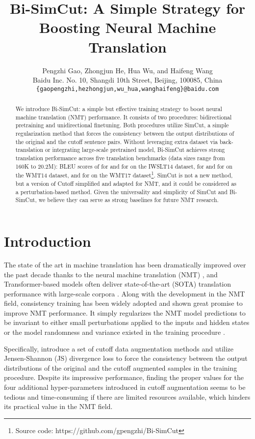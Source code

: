 \documentclass[11pt]{article}
\title{Bi-SimCut: A Simple Strategy for Boosting Neural Machine Translation}
\author{Pengzhi Gao, Zhongjun He, Hua Wu, and Haifeng Wang \\
Baidu Inc. No. 10, Shangdi 10th Street, Beijing, 100085, China \\
\texttt{\{gaopengzhi,hezhongjun,wu\_hua,wanghaifeng\}@baidu.com} 
}
\begin{document}
\maketitle


\begin{abstract}
We introduce Bi-SimCut: a simple but effective training strategy to boost neural machine translation (NMT) performance. It consists of two procedures: bidirectional pretraining and unidirectional finetuning. Both procedures utilize SimCut, a simple regularization method that forces the consistency between the output distributions of the original and the cutoff sentence pairs. Without leveraging extra dataset via back-translation or integrating large-scale pretrained model, Bi-SimCut achieves strong translation performance across five translation benchmarks (data sizes range from 160K to 20.2M): BLEU scores of  for  and  for  on the IWSLT14 dataset,  for  and  for  on the WMT14 dataset, and  for  on the WMT17 dataset\footnote{Source code: https://github.com/gpengzhi/Bi-SimCut}. SimCut is not a new method, but a version of Cutoff \cite{shen2020simple} simplified and adapted for NMT, and it could be considered as a perturbation-based method. Given the universality and simplicity of SimCut and Bi-SimCut, we believe they can serve as strong baselines for future NMT research.
\end{abstract}


\section{Introduction}

The state of the art in machine translation has been dramatically improved over the past decade thanks to the neural machine translation (NMT) \cite{wu2016google}, and Transformer-based models \cite{vaswani2017attention} often deliver state-of-the-art (SOTA) translation performance with large-scale corpora \cite{ott2018scaling}.
Along with the development in the NMT field, consistency training \cite{bachman2014learning} has been widely adopted and shown great promise to improve NMT performance. It simply regularizes the NMT model predictions to be invariant to either small perturbations applied to the inputs \cite{sano2019effective,shen2020simple} and hidden states \cite{chen2021manifold} or the model randomness and variance existed in the training procedure \cite{liang2021r}. 

Specifically, \citet{shen2020simple} introduce a set of cutoff data augmentation methods and utilize Jensen-Shannon (JS) divergence loss to force the consistency between the output distributions of the original and the cutoff augmented samples in the training procedure. Despite its impressive performance, finding the proper values for the four additional hyper-parameters introduced in cutoff augmentation seems to be tedious and time-consuming if there are limited resources available, which hinders its practical value in the NMT field. 
\end{document}
